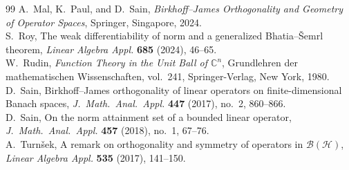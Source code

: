 \documentclass[12pt]{amsart}
\theoremstyle{definition}
\newcommand{\B}{\mathcal{B}}
\begin{document}
\begin{thebibliography}{99}
A.~Mal, K.~Paul, and D.~Sain,
\emph{Birkhoff--James Orthogonality and Geometry of Operator Spaces},
Springer, Singapore, 2024.\\



S.~Roy,
The weak differentiability of norm and a generalized Bhatia--\v{S}emrl theorem,
\emph{Linear Algebra Appl.} \textbf{685} (2024), 46--65.\\

W.~Rudin,
\emph{Function Theory in the Unit Ball of $\mathbb{C}^n$},
Grundlehren der mathematischen Wissenschaften, vol.~241,
Springer-Verlag, New York, 1980.\\

D.~Sain,
Birkhoff--James orthogonality of linear operators on finite-dimensional Banach spaces,
\emph{J.\ Math.\ Anal.\ Appl.} \textbf{447} (2017), no.~2, 860--866.\\

D.~Sain,
On the norm attainment set of a bounded linear operator,
\emph{J.\ Math.\ Anal.\ Appl.} \textbf{457} (2018), no.~1, 67--76.\\


A.~Turn\v{s}ek,
A remark on orthogonality and symmetry of operators in $\B(\mathcal{H})$,
\emph{Linear Algebra Appl.} \textbf{535} (2017), 141--150.

\end{thebibliography}
\end{document}
